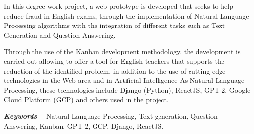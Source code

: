 \documentclass[../Main.tex]{subfiles}
\begin{document}
\begin{justify}
In this degree work project, a web prototype is developed that seeks to help reduce fraud in English exams, through the implementation of Natural Language Processing algorithms with the integration of different tasks such as Text Generation and Question Answering.

Through the use of the Kanban development methodology, the development is carried out allowing to offer a tool for English teachers that supports the reduction of the identified problem, in addition to the use of cutting-edge technologies in the Web area and in Artificial Intelligence As Natural Language Processing, these technologies include Django (Python), ReactJS, GPT-2, Google Cloud Platform (GCP) and others used in the project.
\end{justify}

\par\vspace*{\fill} %
\textbf{\textit{Keywords --}} Natural Language Processing, Text generation, Question Answering, Kanban, GPT-2, GCP, Django, ReactJS. %
\end{document}

